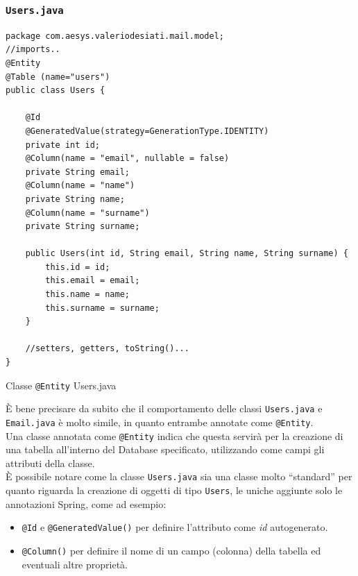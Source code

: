 \subsubsection{\texttt{Users.java}}
\begin{algorithm}[H]
\centering
\begin{verbatim}
package com.aesys.valeriodesiati.mail.model;
//imports..
@Entity
@Table (name="users")
public class Users {

    @Id
    @GeneratedValue(strategy=GenerationType.IDENTITY)
    private int id;
    @Column(name = "email", nullable = false)
    private String email;
    @Column(name = "name")
    private String name;
    @Column(name = "surname")
    private String surname;

    public Users(int id, String email, String name, String surname) {
        this.id = id;
        this.email = email;
        this.name = name;
        this.surname = surname;
    }

    //setters, getters, toString()...
}
\end{verbatim}
\caption{Classe \texttt{@Entity} Users.java}\label{alg:usersjava}
\end{algorithm}

È bene precisare da subito che il comportamento delle classi \texttt{Users.java} e \texttt{Email.java} è molto simile, 
in quanto entrambe annotate come \texttt{@Entity}.\\
Una classe annotata come \texttt{@Entity} indica che questa servirà per la creazione di una tabella all'interno del Database specificato, 
utilizzando come campi gli attributi della classe.\\
È possibile notare come la classe \texttt{Users.java} sia una classe molto “standard” per quanto riguarda la creazione di oggetti di tipo \texttt{Users}, 
le uniche aggiunte solo le annotazioni Spring, come ad esempio:
\begin{itemize}
\item \texttt{@Id} e \texttt{@GeneratedValue()} per definire l'attributo come \emph{id} autogenerato.
\item \texttt{@Column()} per definire il nome di un campo (colonna) della tabella ed eventuali altre proprietà.
\end{itemize}
\newpage
